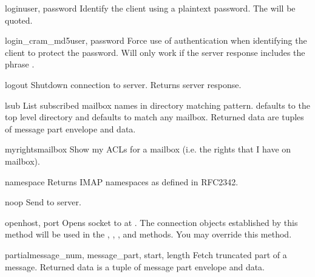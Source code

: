 \begin{methoddesc}{login}{user, password}
  Identify the client using a plaintext password.
  The  will be quoted.
\end{methoddesc}

\begin{methoddesc}{login_cram_md5}{user, password}
  Force use of  authentication when identifying the
  client to protect the password.  Will only work if the server
   response includes the phrase .
\end{methoddesc}

\begin{methoddesc}{logout}{}
  Shutdown connection to server. Returns server  response.
\end{methoddesc}

\begin{methoddesc}{lsub}{}
  List subscribed mailbox names in directory matching pattern.
   defaults to the top level directory and
   defaults to match any mailbox.
  Returned data are tuples of message part envelope and data.
\end{methoddesc}

\begin{methoddesc}{myrights}{mailbox}
  Show my ACLs for a mailbox (i.e. the rights that I have on mailbox).
\end{methoddesc}

\begin{methoddesc}{namespace}{}
  Returns IMAP namespaces as defined in RFC2342.
\end{methoddesc}

\begin{methoddesc}{noop}{}
  Send  to server.
\end{methoddesc}

\begin{methoddesc}{open}{host, port}
  Opens socket to  at .
  The connection objects established by this method
  will be used in the , , , and
   methods.
  You may override this method.
\end{methoddesc}

\begin{methoddesc}{partial}{message_num, message_part, start, length}
  Fetch truncated part of a message.
  Returned data is a tuple of message part envelope and data.
\end{methoddesc}

